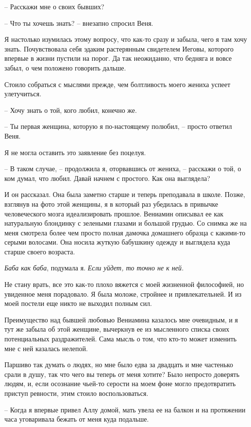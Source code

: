 \documentclass[
]{book}
\begin{document}
-- Расскажи мне о своих бывших?

-- Что ты хочешь знать? -- внезапно спросил Веня.

Я настолько изумилась этому вопросу, что как-то сразу и забыла, чего я там хочу знать. Почувствовала себя эдаким растерянным свидетелем Иеговы, которого впервые в жизни пустили на порог. Да так неожиданно, что бедняга и вовсе забыл, о чем положено говорить дальше.

Стоило собраться с мыслями прежде, чем болтливость моего жениха успеет улетучиться.

-- Хочу знать о той, кого любил, конечно же.

-- Ты первая женщина, которую я по-настоящему полюбил, -- просто ответил Веня.

Я не могла оставить это заявление без поцелуя.

-- В таком случае, -- продолжила я, оторвавшись от жениха, -- расскажи о той, о ком думал, что любил. Давай начнем с простого. Как она выглядела?

И он рассказал. Она была заметно старше и теперь преподавала в школе. Позже, взглянув на фото этой женщины, я в который раз убедилась в привычке человеческого мозга идеализировать прошлое. Вениамин описывал ее как натуральную блондинку с зелеными глазами и большой грудью. Со снимка же на меня смотрела более чем просто полная дамочка домашнего образца с какими-то серыми волосами. Она носила жуткую бабушкину одежду и выглядела куда старше своего возраста.

\emph{Баба как баба}, подумала я. \emph{Если уйдет, то точно не к ней.}

Не стану врать, все это как-то плохо вяжется с моей жизненной философией, но увиденное меня порадовало. Я была моложе, стройнее и привлекательней. И из моей постели еще никто не выходил полным сил.

Преимущество над бывшей любовью Вениамина казалось мне очевидным, и я тут же забыла об этой женщине, вычеркнув ее из мысленного списка своих потенциальных раздражителей. Сама мысль о том, что кто-то может изменить мне с ней казалась нелепой.

Паршиво так думать о людях, но мне было едва за двадцать и мне частенько срали в душу, так что чего вы теперь от меня хотите? Было непросто доверять людям, и, если осознание чьей-то серости на моем фоне могло предотвратить приступ ревности, этим стоило воспользоваться.

-- Когда я впервые привел Аллу домой, мать увела ее на балкон и на протяжении часа уговаривала бежать от меня куда подальше.
\end{document}
